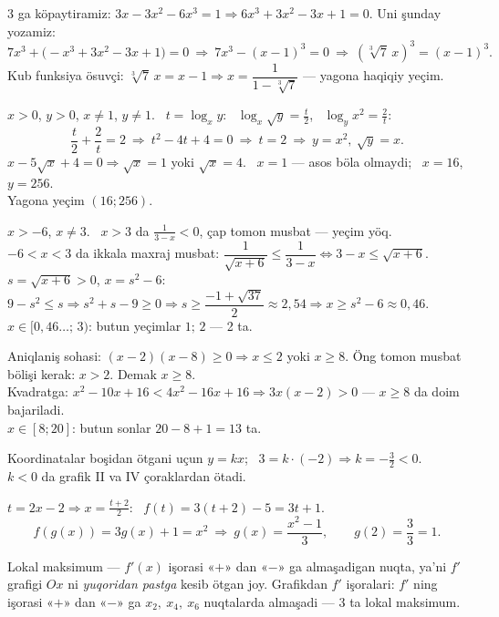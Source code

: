 3 ga köpaytiramiz: $3x-3x^2-6x^3=1\Rightarrow 6x^3+3x^2-3x+1=0$. Uni şunday yozamiz:
\[7x^3+\bigl(-x^3+3x^2-3x+1\bigr)=0\ \Rightarrow\ 7x^3-(x-1)^3=0\ \Rightarrow\ (\sqrt[3]7\,x)^3=(x-1)^3.\]
Kub funksiya ösuvçi: $\sqrt[3]7\,x=x-1\Rightarrow x=\dfrac1{1-\sqrt[3]7}$ — yagona haqiqiy yeçim.

$x>0$, $y>0$, $x\ne1$, $y\ne1$. \ $t=\log_xy$: \ $\log_x\sqrt y=\frac t2$, \ $\log_yx^2=\frac2t$:
\[\frac t2+\frac2t=2\ \Rightarrow\ t^2-4t+4=0\ \Rightarrow\ t=2\ \Rightarrow\ y=x^2,\ \sqrt y=x.\]
$x-5\sqrt x+4=0\Rightarrow\sqrt x=1$ yoki $\sqrt x=4$. \ $x=1$ — asos böla olmaydi; \ $x=16$, $y=256$.\\
Yagona yeçim $(16;256)$.

$x>-6$, $x\ne3$. \ $x>3$ da $\frac1{3-x}<0$, çap tomon musbat — yeçim yöq.\\
$-6<x<3$ da ikkala maxraj musbat: $\dfrac1{\sqrt{x+6}}\le\dfrac1{3-x}\iff 3-x\le\sqrt{x+6}$.\\
$s=\sqrt{x+6}>0$, $x=s^2-6$: \ $9-s^2\le s\Rightarrow s^2+s-9\ge0\Rightarrow s\ge\dfrac{-1+\sqrt{37}}2\approx2{,}54\Rightarrow x\ge s^2-6\approx0{,}46$.\\
$x\in[0{,}46\ldots;\,3)$: butun yeçimlar $1;\,2$ — 2 ta.

Aniqlaniş sohasi: $(x-2)(x-8)\ge0\Rightarrow x\le2$ yoki $x\ge8$. Öng tomon musbat bölişi kerak: $x>2$. Demak $x\ge8$.\\
Kvadratga: $x^2-10x+16<4x^2-16x+16\Rightarrow 3x(x-2)>0$ — $x\ge8$ da doim bajariladi.\\
$x\in[8;20]$: butun sonlar $20-8+1=13$ ta.

Koordinatalar boşidan ötgani uçun $y=kx$; \ $3=k\cdot(-2)\Rightarrow k=-\frac32<0$.\\
$k<0$ da grafik II va IV çoraklardan ötadi.

$t=2x-2\Rightarrow x=\frac{t+2}2$: \ $f(t)=3(t+2)-5=3t+1$.
\[f(g(x))=3g(x)+1=x^2\ \Rightarrow\ g(x)=\frac{x^2-1}3,\qquad g(2)=\frac{3}3=1.\]

Lokal maksimum — $f'(x)$ işorasi «$+$» dan «$-$» ga almaşadigan nuqta, ya'ni $f'$ grafigi $Ox$ ni \emph{yuqoridan pastga} kesib ötgan joy. Grafikdan $f'$ işoralari:
$f'$ ning işorasi «$+$» dan «$-$» ga $x_2,\ x_4,\ x_6$ nuqtalarda almaşadi — 3 ta lokal maksimum.

